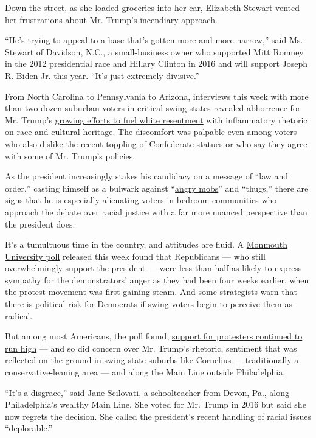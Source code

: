 Down the street, as she loaded groceries into her car, Elizabeth Stewart
vented her frustrations about Mr. Trump's incendiary approach.

``He's trying to appeal to a base that's gotten more and more narrow,''
said Ms. Stewart of Davidson, N.C., a small-business owner who supported
Mitt Romney in the 2012 presidential race and Hillary Clinton in 2016
and will support Joseph R. Biden Jr. this year. ``It's just extremely
divisive.''

From North Carolina to Pennsylvania to Arizona, interviews this week
with more than two dozen suburban voters in critical swing states
revealed abhorrence for Mr. Trump's
\href{https://www.nytimes.com/2020/07/06/us/politics/trump-bubba-wallace-nascar.html}{growing
efforts to fuel white resentment} with inflammatory rhetoric on race and
cultural heritage. The discomfort was palpable even among voters who
also dislike the recent toppling of Confederate statues or who say they
agree with some of Mr. Trump's policies.

As the president increasingly stakes his candidacy on a message of ``law
and order,'' casting himself as a bulwark against
``\href{https://www.nytimes.com/2020/07/03/us/politics/trump-coronavirus-mount-rushmore.html}{angry
mobs}'' and ``thugs,'' there are signs that he is especially alienating
voters in bedroom communities who approach the debate over racial
justice with a far more nuanced perspective than the president does.

It's a tumultuous time in the country, and attitudes are fluid. A
\href{https://www.monmouth.edu/polling-institute/documents/monmouthpoll_us_070820.pdf/}{Monmouth
University poll} released this week found that Republicans --- who still
overwhelmingly support the president --- were less than half as likely
to express sympathy for the demonstrators' anger as they had been four
weeks earlier, when the protest movement was first gaining steam. And
some strategists warn that there is political risk for Democrats if
swing voters begin to perceive them as radical.

But among most Americans, the poll found,
\href{https://www.nytimes.com/2020/07/08/us/politics/polling-race-protesters.html}{support
for protesters continued to run high} --- and so did concern over Mr.
Trump's rhetoric, sentiment that was reflected on the ground in swing
state suburbs like Cornelius --- traditionally a conservative-leaning
area --- and along the Main Line outside Philadelphia.

``It's a disgrace,'' said Jane Scilovati, a schoolteacher from Devon,
Pa., along Philadelphia's wealthy Main Line. She voted for Mr. Trump in
2016 but said she now regrets the decision. She called the president's
recent handling of racial issues ``deplorable.''

